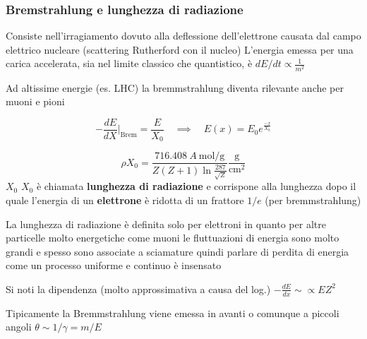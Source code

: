 \subsubsection*{Bremstrahlung e lunghezza di radiazione}
Consiste nell'irragiamento dovuto alla deflessione dell'elettrone causata dal campo elettrico nucleare (scattering Rutherford con il nucleo)
\newline
L'energia emessa per una carica accelerata, sia nel limite classico che quantistico, è $dE/dt \propto \frac{1}{m^2}$

\begin{note}
    Ad altissime energie (es. LHC) la bremmstrahlung diventa rilevante anche per muoni e pioni
\end{note}

\[-\frac{dE}{dX} \Bigr|_\text{Brem} =\frac{E}{X_{0}} \quad \implies \quad  E(x) = E_{0} e^{\frac{-x}{X_{0} }} \]

\[\rho X_{0} =\frac{716.408 \: A \: \text{mol/g}}{Z(Z+1)\ln \frac{287}{\sqrt{Z} }} \frac{\text{g} }{\text{cm}^{2}  }
    \]
\(X_{0} \) $X_0$ è chiamata \textbf{lunghezza di radiazione} e corrispone alla lunghezza dopo il quale l'energia di un \textbf{elettrone} è ridotta di un frattore $1/e$ (per bremmstrahlung)

\begin{note}
    La lunghezza di radiazione è definita solo per elettroni in quanto per altre particelle molto energetiche come muoni le fluttuazioni di energia sono molto grandi e spesso sono associate a sciamature quindi parlare di perdita di energia come un processo uniforme e continuo è insensato
\end{note}
\begin{remark}

    Si noti la dipendenza (molto approssimativa a causa del log.) $-\frac{dE}{dx} \sim \propto E Z^2$

\end{remark}
Tipicamente la Bremmstrahlung viene emessa in avanti o comunque a piccoli angoli $\theta \sim1/\gamma=m/E$

